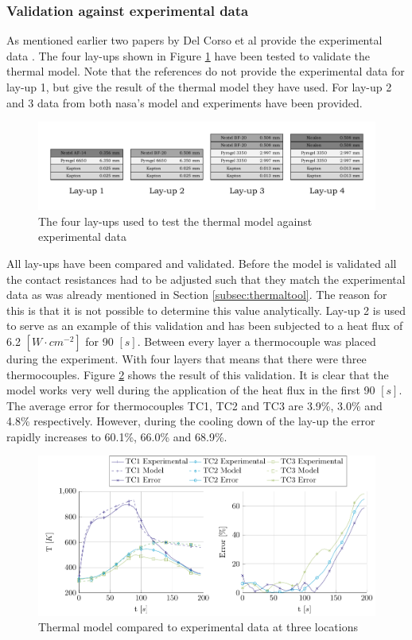 \subsubsection{Validation against experimental data}
As mentioned earlier two papers by Del Corso et al provide the experimental data \cite{Corso2009,Corso2011}. The four lay-ups shown in Figure \ref{fig:vallayup} have been tested to validate the thermal model. Note that the references do not provide the experimental data for lay-up 1, but give the result of the thermal model they have used. For lay-up 2 and 3 data from both \gls{nasa}'s model and experiments have been provided. 


\begin{figure}[h]
	\centering
	\includegraphics[width=\textwidth]{Figure/Thermal/vallayup.pdf}
	\caption{The four lay-ups used to test the thermal model against experimental data}
	\label{fig:vallayup}
\end{figure}

All lay-ups have been compared and validated. Before the model is validated all the contact resistances had to be adjusted such that they match the experimental data as was already mentioned in Section \ref{subsec:thermaltool}. The reason for this is that it is not possible to determine this value analytically. Lay-up 2 is used to serve as an example of this validation and has been subjected to a heat flux of 6.2 $\left[W\cdot cm^{-2}\right]$ for 90 $\left[s\right]$. Between every layer a thermocouple was placed during the experiment. With four layers that means that there were three thermocouples. Figure \ref{fig:plotvallay2} shows the result of this validation. It is clear that the model works very well during the application of the heat flux in the first 90 $\left[s\right]$. The average error for thermocouples TC1, TC2 and TC3 are 3.9\%, 3.0\% and 4.8\% respectively. However, during the cooling down of the lay-up the error rapidly increases to 60.1\%, 66.0\% and 68.9\%.

\begin{figure}[H]
	\centering
	\includegraphics[width=\textwidth]{Figure/Thermal/plotvallay2.pdf}
	\caption{Thermal model compared to experimental data at three locations}
	\label{fig:plotvallay2}
\end{figure}

